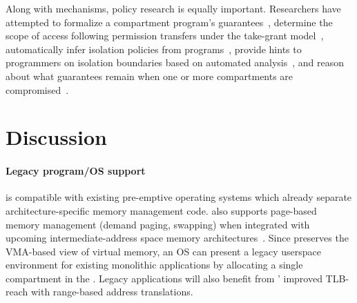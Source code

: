 Along with mechanisms, policy research is equally important.
Researchers have attempted to formalize a compartment program's 
guarantees~\cite{JuglaretHAEP16}, determine the scope of access following
permission transfers under the take-grant model~\cite{LiptonS77},
automatically infer isolation policies from 
programs~\cite{RoesslerAPMPKPB21,KirthDCLDGNVF22,VasilakisKRDDS17},
provide hints to programmers on isolation boundaries based on
automated analysis~\cite{GudkaWACDLMNR15}, and
reason about what guarantees remain when one or more compartments are
compromised~\cite{AbateABEFHLPST18}. 

\section{Discussion}

\paragraph{Legacy program/OS support}
\seccells is compatible with existing pre-emptive operating systems which 
already separate architecture-specific memory management code.
\seccells also supports page-based memory management (demand paging, swapping)
when integrated with upcoming intermediate-address space memory 
architectures~\cite{ZhangSRL10,0003BOBFP21midgard}.
Since \seccells preserves the VMA-based view of virtual memory, 
an OS can present a legacy userspace environment for existing monolithic
applications by allocating a single compartment in the \ptable.
Legacy applications will also benefit from \seccells' improved 
TLB-reach with range-based address translations.


